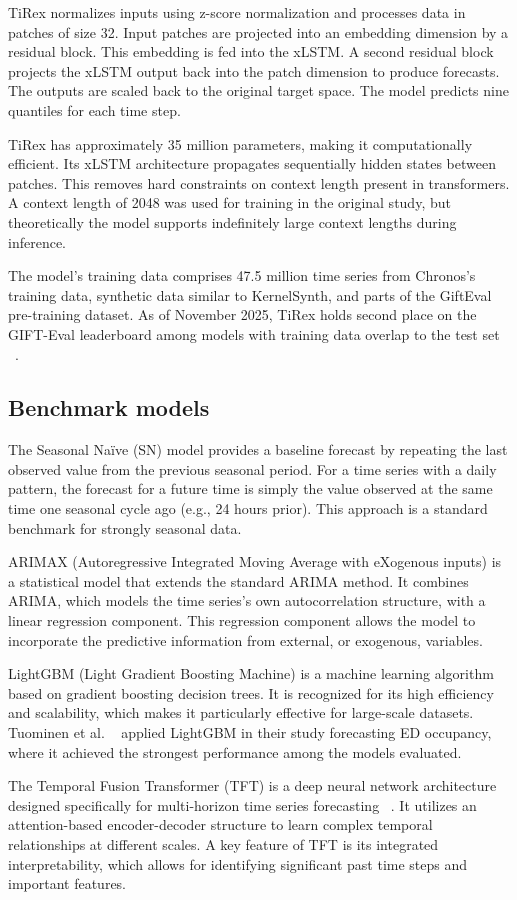 TiRex normalizes inputs using z-score normalization and processes data in patches of size 32.
Input patches are projected into an embedding dimension by a residual block.
This embedding is fed into the xLSTM.
A second residual block projects the xLSTM output back into the patch dimension to produce forecasts.
The outputs are scaled back to the original target space. The model predicts nine quantiles for each time step.

TiRex has approximately 35 million parameters, making it computationally efficient.
Its xLSTM architecture propagates sequentially hidden states between patches. This removes hard constraints on context length present in transformers.
A context length of 2048 was used for training in the original study, but theoretically the model supports indefinitely large context lengths during inference.

The model's training data comprises 47.5 million time series from Chronos's training data, synthetic data similar to KernelSynth, and parts of the GiftEval pre-training dataset.
As of November 2025, TiRex holds second place on the GIFT-Eval leaderboard among models with training data overlap to the test set ~\cite{GIFT-Eval_Leaderboard}.



\subsection{Benchmark models}

The Seasonal Naïve (SN) model provides a baseline forecast by repeating the last observed value from the previous seasonal period. For a time series with a daily pattern, the forecast for a future time is simply the value observed at the same time one seasonal cycle ago (e.g., 24 hours prior). This approach is a standard benchmark for strongly seasonal data. ~\cite{hyndman2018forecasting}

ARIMAX (Autoregressive Integrated Moving Average with eXogenous inputs) is a statistical model that extends the standard ARIMA method. It combines ARIMA, which models the time series's own autocorrelation structure, with a linear regression component. This regression component allows the model to incorporate the predictive information from external, or exogenous, variables. ~\cite{hyndman2018forecasting}

LightGBM (Light Gradient Boosting Machine) is a machine learning algorithm based on gradient boosting decision trees. It is recognized for its high efficiency and scalability, which makes it particularly effective for large-scale datasets. Tuominen et al. ~\cite{tuominen_forecasting_2024} applied LightGBM in their study forecasting ED occupancy, where it achieved the strongest performance among the models evaluated. ~\cite{ke2017lightgbm}

The Temporal Fusion Transformer (TFT) is a deep neural network architecture designed specifically for multi-horizon time series forecasting ~\cite{lim2021temporal}. It utilizes an attention-based encoder-decoder structure to learn complex temporal relationships at different scales. A key feature of TFT is its integrated interpretability, which allows for identifying significant past time steps and important features.